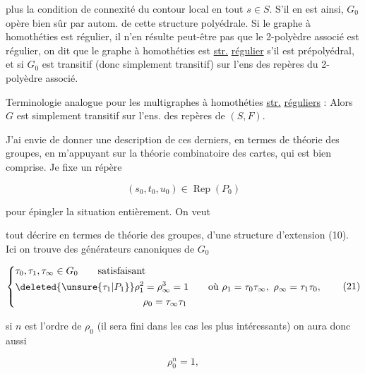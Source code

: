 plus la condition de connexité du contour local en tout $s\in S$. S'il en est ainsi, $G_0$ opère bien sûr par autom. de cette structure polyédrale. Si le graphe à homothéties est régulier, il  n'en résulte peut-être pas que le 2-polyèdre associé est régulier,  on dit que le graphe à homothéties est \uline{str.} \uline{régulier} s'il est prépolyédral, et si $G_0$ est transitif (donc simplement transitif) sur l'ens des repères du 2-polyèdre associé.


Terminologie analogue pour les multigraphes à homothéties \uline{str.} \uline{réguliers} : Alors $G$ est simplement transitif sur l'ens. des repères de $(S,F)$.

J'ai envie de donner une description de ces derniers, en termes de théorie des groupes, en m'appuyant sur la théorie combinatoire des cartes, qui est bien comprise. Je fixe un répère 

\[ (s_0,t_0,u_0)\in\operatorname{Rep}(P_0) \tag*{(20)} \]

pour épingler la situation entièrement.  On veut


tout décrire en termes de théorie des groupes,   d'une structure d'extension (10). Ici on trouve des générateurs canoniques de $G_0$

\[
\left\{\begin{aligned}
 &\tau_0,\tau_1,\tau_\infty\in G_0\qquad\text{satisfaisant}\\
 &\deleted{\unsure{\tau_1|P_1}}\rho_1^{2}=\rho_\infty^3=1\qquad\text{où }\rho_1=\tau_0\tau_\infty,\ \rho_\infty=\tau_1\tau_0,\\
 &\hspace{13em}\rho_0=\tau_\infty\tau_1
\end{aligned}\right.\tag*{(21)}
\]

si $n$ est l'ordre de $\rho_0$ (il sera fini dans les cas les plus intéressants) on aura donc aussi

\[ \rho_0^n=1,\tag*{(22)} \]


